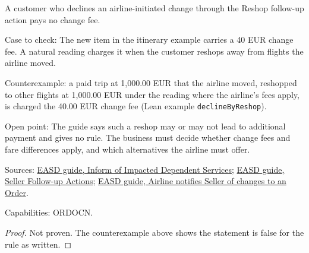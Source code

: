 \begin{theorem}
  \label{thm:airline-change-reshop-after-involuntary}
  A customer who declines an airline-initiated change through the Reshop
  follow-up action pays no change fee.

  Case to check: The new item in the itinerary example carries a 40 EUR
  change fee. A natural reading charges it when the customer reshops away
  from flights the airline moved.

  Counterexample: a paid trip at 1,000.00 EUR that the airline moved,
  reshopped to other flights at 1,000.00 EUR under the reading where the
  airline's fees apply, is charged the 40.00 EUR change fee (Lean example
  \texttt{declineByReshop}).

  Open point: The guide says such a reshop may or may not lead to additional
  payment and gives no rule. The business must decide whether change fees
  and fare differences apply, and which alternatives the airline must offer.

  Sources: \href{https://standards.atlassian.net/wiki/spaces/EASD/pages/672825400}{EASD guide, Inform of Impacted Dependent Services};
  \href{https://standards.atlassian.net/wiki/spaces/EASD/pages/574849094}{EASD guide, Seller Follow-up Actions};
  \href{https://standards.atlassian.net/wiki/spaces/EASD/pages/815202352}{EASD guide, Airline notifies Seller of changes to an Order}.

  Capabilities: ORDOCN.
\end{theorem}
\begin{proof}
  Not proven.  The counterexample above shows the statement is false for the
  rule as written.
\end{proof}

